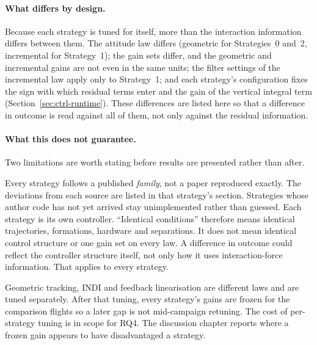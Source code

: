 \paragraph{What differs by design.} Because each strategy is tuned for itself, more than the
interaction information differs between them. The attitude law differs (geometric for Strategies~0
and~2, incremental for Strategy~1); the gain sets differ, and the geometric and incremental gains
are not even in the same units; the filter settings of the incremental law apply only to
Strategy~1; and each strategy's configuration fixes the sign with which residual terms enter and
the gain of the vertical integral term (Section~\ref{sec:ctrl-runtime}). These differences are
listed here so that a difference in outcome is read against all of them, not only against the
residual information.

\paragraph{What this does not guarantee.} Two limitations are worth stating before results are
presented rather than after.

Every strategy follows a published \emph{family}, not a paper reproduced exactly. The deviations
from each source are listed in that strategy's section. Strategies whose author code has not yet
arrived stay unimplemented rather than guessed. Each strategy is its own controller. ``Identical
conditions'' therefore means identical trajectories, formations, hardware and separations. It does
not mean identical control structure or one gain set on every law. A difference in outcome could
reflect the controller structure itself, not only how it uses interaction-force information. That
applies to every strategy.

Geometric tracking, INDI and feedback linearisation are different laws and are tuned separately.
After that tuning, every strategy's gains are frozen for the comparison flights so a later gap is
not mid-campaign retuning. The cost of per-strategy tuning is in scope for RQ4. The discussion
chapter reports where a frozen gain appears to have disadvantaged a strategy.

